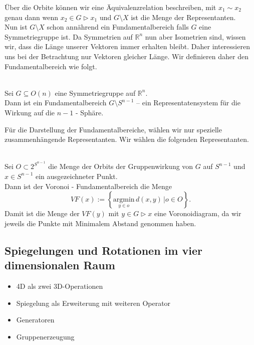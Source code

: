 Über die Orbite können wir eine Äquivalenzrelation beschreiben, mit $x_1 \sim x_2$ genau dann wenn $x_2 \in G \rhd x_1$ und $G \setminus X$ ist die Menge der Representanten.\\

Nun ist $G \setminus X$ schon annährend ein Fundamentalbereich falls $G$ eine Symmetriegruppe ist. Da Symmetrien auf $\mathbb{R}^n$ nun aber Isometrien sind, wissen wir, dass die Länge unserer Vektoren immer erhalten bleibt. Daher interessieren uns bei der Betrachtung nur Vektoren gleicher Länge. Wir definieren daher den Fundamentalbereich wie folgt.\\

\begin{definition}[Fundamentalbereich]\label{fundamentalbereich:def} \mbox{}\\
   Sei $G \subseteq O(n)$ eine Symmetriegruppe auf $\mathbb{R}^n$.\\

   Dann ist ein Fundamentalbereich $G \setminus S^{n-1}$ -- ein Representatensystem für die Wirkung auf die $n-1$ - Sphäre.
\end{definition}

Für die Darstellung der Fundamentalbereiche, wählen wir nur spezielle zusammenhängende Representanten. Wir wählen die folgenden Representanten.

\begin{definition}\label{fundamentalbereich:voronoi} \mbox{}\\
   Sei $O \subset 2^{S^{n-1}}$ die Menge der Orbits der Gruppenwirkung von $G$ auf $S^{n-1}$ und $x \in S^{n-1}$ ein ausgezeichneter Punkt.\\

   Dann ist der Voronoi - Fundamentalbereich die Menge
   $$
      VF(x) := \left\{ \underset{y\in o}{\text{argmin}} \, d(x,y) \, |  o \in O\right\}.
   $$
   Damit ist die Menge der $VF(y)$ mit $y \in G \rhd x$ eine Voronoidiagram, da wir jeweils die Punkte mit Minimalem Abstand genommen haben.
\end{definition}


\newpage
\subsection{Spiegelungen und Rotationen im vier dimensionalen Raum}

\begin{itemize}
	\item 4D als zwei 3D-Operationen
	\item Spiegelung als Erweiterung mit weiteren Operator
	\item Generatoren
	\item Gruppenerzeugung
\end{itemize} 

